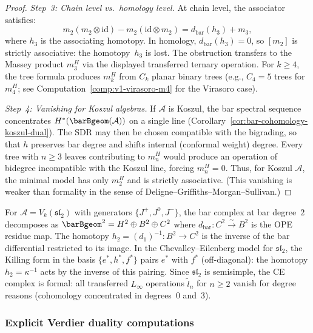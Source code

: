 \begin{proof}
\emph{Step~3: Chain level vs.\ homology level.}
At chain level, the associator satisfies:
\[
m_2(m_2 \otimes \mathrm{id}) - m_2(\mathrm{id} \otimes m_2)
= d_{\mathrm{bar}}(h_3) + m_3,
\]
where $h_3$ is the associating homotopy. In homology,
$d_{\mathrm{bar}}(h_3) = 0$, so $[m_2]$ is strictly associative:
the homotopy~$h_3$ is lost. The obstruction transfers to the
  Massey product $m_3^H$ via the displayed transferred ternary operation.
  For $k \geq 4$,
the tree formula produces $m_k^H$ from $C_k$ planar binary trees
(e.g., $C_4 = 5$ trees for $m_4^H$; see
Computation~\ref{comp:v1-virasoro-m4} for the Virasoro case).

\emph{Step~4: Vanishing for Koszul algebras.}
If $\mathcal{A}$ is Koszul, the bar spectral sequence
concentrates $H^*(\barBgeom(\mathcal{A}))$ on a single line
(Corollary~\ref{cor:bar-cohomology-koszul-dual}).
The SDR may then be chosen compatible with the bigrading,
so that $h$ preserves bar degree and shifts internal
(conformal weight) degree.
Every tree with $n \geq 3$ leaves contributing to $m_n^H$
would produce an operation of bidegree incompatible with
the Koszul line, forcing $m_n^H = 0$.
Thus, for Koszul $\mathcal{A}$, the minimal model has only
$m_2^H$ and is strictly associative. (This vanishing is weaker
than formality in the sense of
Deligne--Griffiths--Morgan--Sullivan.)
\end{proof}

\begin{example}
\label{ex:sdr-sl2}
For $\mathcal{A} = V_k(\mathfrak{sl}_2)$ with generators
$\{J^+, J^0, J^-\}$, the bar complex at bar degree~$2$
decomposes as $\barBgeom^2 = H^2 \oplus B^2 \oplus C^2$
where $d_{\mathrm{bar}}\colon C^2 \xrightarrow{\sim} B^2$
is the OPE residue map. The homotopy
$h_2 = (d_1)^{-1}\colon B^2 \to C^2$ is the inverse of the
bar differential restricted to its image. In the Chevalley--Eilenberg
model for $\mathfrak{sl}_2$, the Killing form in the basis
$\{e^*, h^*, f^*\}$ pairs $e^*$ with $f^*$ (off-diagonal):
the homotopy $h_2 = \kappa^{-1}$ acts by the inverse of this pairing.
Since $\mathfrak{sl}_2$ is semisimple, the CE complex is formal:
all transferred $L_\infty$ operations $\tilde{l}_n$ for $n \geq 2$
vanish for degree reasons (cohomology concentrated in
degrees~$0$ and~$3$).
\end{example}

\subsubsection{Explicit Verdier duality computations}

